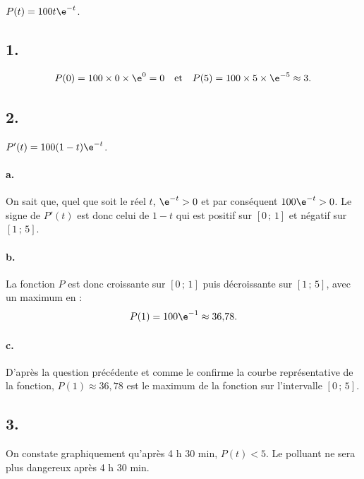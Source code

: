 \(P(t) = 100t\e^{-t}\).

\subsection*{1.}

\[
P(0) = 100 \times 0 \times \e^0 = 0 \quad \text{et} \quad P(5) = 100 \times 5 \times \e^{-5} \approx 3.
\]

\subsection*{2.}

\(P'(t) = 100(1 - t)\e^{-t}\).

\paragraph{a.} On sait que, quel que soit le réel \(t\), \(\e^{-t} > 0\) et par conséquent \(100\e^{-t} > 0\). Le signe de \(P'(t)\) est donc celui de \(1 - t\) qui est positif sur \([0 \,;\, 1]\) et négatif sur \([1 \,;\, 5]\).

\paragraph{b.} La fonction \(P\) est donc croissante sur \([0 \,;\, 1]\) puis décroissante sur \([1 \,;\, 5]\), avec un maximum en :
\[
P(1) = 100\e^{-1} \approx 36{,}78.
\]

\begin{center}
\end{center}

\paragraph{c.} D'après la question précédente et comme le confirme la courbe représentative de la fonction, \(P(1) \approx 36{,}78\) est le maximum de la fonction sur l'intervalle \([0 \,;\, 5]\).

\subsection*{3.}

On constate graphiquement qu'après 4 h 30 min, \(P(t) < 5\). Le polluant ne sera plus dangereux après 4 h 30 min.
